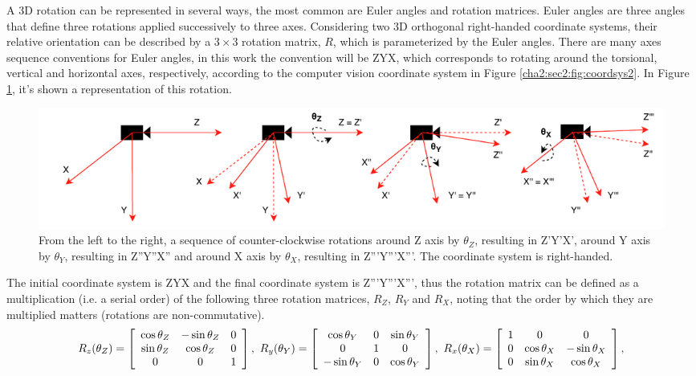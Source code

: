 A 3D rotation can be represented in several ways, the most common are Euler angles and rotation matrices. Euler angles are three angles that define three rotations applied successively to three axes. Considering two 3D orthogonal right-handed coordinate systems, their relative orientation can be described by a $3\times3$ rotation matrix, $R$, which is parameterized by the Euler angles. There are many axes sequence conventions for Euler angles, in this work the convention will be ZYX, which corresponds to rotating around the torsional, vertical and horizontal axes, respectively, according to the computer vision coordinate system in Figure \ref{cha2:sec2:fig:coordsys2}. In Figure \ref{cha2:sec2:fig:eulerangles}, it's shown a representation of this rotation. 
\begin{figure}[!htb]
	\centering
	\includegraphics[width=\textwidth]{images/eulerangles.pdf}
	\caption[Euler angles convention ZYX]{From the left to the right, a sequence of counter-clockwise rotations around Z axis by $\theta_Z$, resulting in Z'Y'X', around Y axis by $\theta_Y$, resulting in Z''Y''X'' and around X axis by $\theta_X$, resulting in Z'''Y'''X'''. The coordinate system is right-handed.}
	\label{cha2:sec2:fig:eulerangles}
\end{figure}
The initial coordinate system is ZYX and the final coordinate system is Z'''Y'''X''', thus the rotation matrix can be defined as a multiplication (i.e. a serial order) of the following three rotation matrices, $R_Z$, $R_Y$ and $R_X$, noting that the order by which they are multiplied matters (rotations are non-commutative).
\begin{equation}
\label{rrr}
R _ { z } ( \theta_Z ) = \left[ \begin{array} { c c c } { \cos \theta_Z } & { - \sin \theta_Z } & { 0 } \\ { \sin \theta_Z } & { \cos \theta_Z } & { 0 } \\ { 0 } & { 0 } & { 1 } \end{array} \right], \
R _ { y } ( \theta_Y ) = \left[ \begin{array} { c c c } { \cos \theta_Y } & { 0 } & { \sin \theta_Y } \\ { 0 } & { 1 } & { 0 } \\ { - \sin \theta_Y } & { 0 } & { \cos \theta_Y } \end{array} \right], \
R _ { x } ( \theta_X ) = \left[ \begin{array} { c c c } { 1 } & { 0 } & { 0 } \\ { 0 } & { \cos \theta_X } & { - \sin \theta_X } \\ { 0 } & { \sin \theta_X } & { \cos \theta_X} \end{array} \right],
\end{equation}
